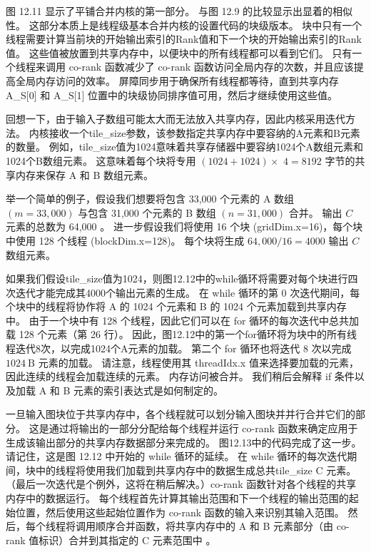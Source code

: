 图 12.11 显示了平铺合并内核的第一部分。 与图 12.9 的比较显示出显着的相似性。 这部分本质上是线程级基本合并内核的设置代码的块级版本。 块中只有一个线程需要计算当前块的开始输出索引的Rank值和下一个块的开始输出索引的Rank值。 这些值被放置到共享内存中，以便块中的所有线程都可以看到它们。 只有一个线程来调用 co-rank 函数减少了 co-rank 函数访问全局内存的次数，并且应该提高全局内存访问的效率。 屏障同步用于确保所有线程都等待，直到共享内存 A\_S[0] 和 A\_S[1] 位置中的块级协同排序值可用，然后才继续使用这些值。

回想一下，由于输入子数组可能太大而无法放入共享内存，因此内核采用迭代方法。 内核接收一个tile\_size参数，该参数指定共享内存中要容纳的$\mathrm{A}$元素和$\mathrm{B}$元素的数量。 例如，tile\_size值为1024意味着共享存储器中要容纳1024个A数组元素和1024个B数组元素。 这意味着每个块将专用 $(1024+1024) \times$ $4=8192$ 字节的共享内存来保存 A 和 B 数组元素。

举一个简单的例子，假设我们想要将包含 33,000 个元素的 A 数组 $(m=33,000)$ 与包含 31,000 个元素的 B 数组 $(n=31,000)$ 合并。 输出 $C$ 元素的总数为 64,000 。 进一步假设我们将使用 16 个块 (gridDim.x=16)，每个块中使用 128 个线程 (blockDim.x=128)。 每个块将生成 $64,000 / 16=4000$ 输出 $C$ 数组元素。

如果我们假设tile\_size值为1024，则图12.12中的while循环将需要对每个块进行四次迭代才能完成其4000个输出元素的生成。 在 while 循环的第 0 次迭代期间，每个块中的线程将协作将 A 的 1024 个元素和 B 的 1024 个元素加载到共享内存中。 由于一个块中有 128 个线程，因此它们可以在 for 循环的每次迭代中总共加载 128 个元素（第 26 行）。 因此，图12.12中的第一个for循环将为块中的所有线程迭代8次，以完成1024个A元素的加载。 第二个 for 循环也将迭代 8 次以完成 $1024 \mathrm{~B}$ 元素的加载。 请注意，线程使用其 threadIdx.x 值来选择要加载的元素，因此连续的线程会加载连续的元素。 内存访问被合并。 我们稍后会解释 if 条件以及加载 A 和 B 元素的索引表达式是如何制定的。

一旦输入图块位于共享内存中，各个线程就可以划分输入图块并并行合并它们的部分。 这是通过将输出的一部分分配给每个线程并运行 co-rank 函数来确定应用于生成该输出部分的共享内存数据部分来完成的。 图12.13中的代码完成了这一步。 请记住，这是图 12.12 中开始的 while 循环的延续。 在 while 循环的每次迭代期间，块中的线程将使用我们加载到共享内存中的数据生成总共tile\_size $\mathrm{C}$ 元素。 （最后一次迭代是个例外，这将在稍后解决。）co-rank 函数针对各个线程的共享内存中的数据运行。 每个线程首先计算其输出范围和下一个线程的输出范围的起始位置，然后使用这些起始位置作为 co-rank 函数的输入来识别其输入范围。 然后，每个线程将调用顺序合并函数，将共享内存中的 $\mathrm{A}$ 和 B 元素部分（由 co-rank 值标识）合并到其指定的 $\mathrm{C}$ 元素范围中 。

